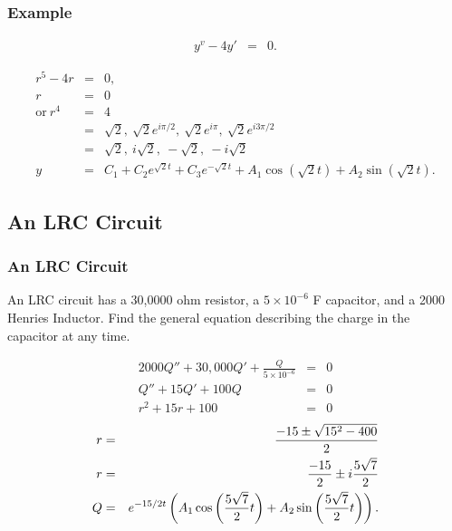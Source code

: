 \begin{frame}
  \frametitle{Example}

  \begin{eqnarray*}
    y^v - 4 y'& = & 0.
  \end{eqnarray*}

  {
    \begin{eqnarray*}
      r^5 - 4r & = & 0, \\
      r & = & 0 \\
      \mathrm{or~} r^4 & = & 4 \\
      & = & \sqrt{2},~\sqrt{2}e^{i \pi/2}, ~ \sqrt{2}e^{i \pi},~ \sqrt{2}e^{i 3\pi/2} \\
      & = & \sqrt{2},~i\sqrt{2},~-\sqrt{2},~-i\sqrt{2} \\
      y & = & C_1 + C_2 e^{\sqrt{2}t} + C_3 e^{-\sqrt{2}t} + 
      A_1 \cos(\sqrt{2}t) + A_2 \sin(\sqrt{2}t).
    \end{eqnarray*}
  }


\end{frame}

\subsection{An LRC Circuit}

\begin{frame}
  \frametitle{An LRC Circuit}

  An LRC circuit has a 30,0000 ohm resistor, a $5\times 10^{-6}$ F
  capacitor, and a 2000 Henries Inductor. Find the general equation
  describing  the charge in the capacitor at any time.

  {
    \begin{eqnarray*}
      2000 Q'' + 30,000 Q' + \frac{Q}{5\times 10^{-6}} & = & 0 \\
      Q'' + 15 Q' + 100 Q & = & 0 \\
      r^2 + 15 r + 100 & = & 0 
    \end{eqnarray*}
    \begin{eqnarray*}
      r & = & \frac{-15\pm\sqrt{15^2-400}}{2} \\
      r & = & \frac{-15}{2} \pm i\frac{5\sqrt{7}}{2} \\
      Q & = & e^{-15/2 t} 
      \left( A_1 \cos\left( \frac{5\sqrt{7}}{2} t\right) + A_2 \sin\left( \frac{5\sqrt{7}}{2} t \right) \right).
    \end{eqnarray*}
    
  }

\end{frame}

